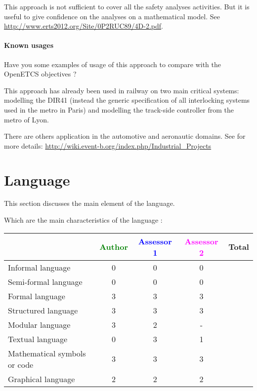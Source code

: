 \begin{author_comment}
This approach is not sufficient to cover all the safety analyses activities. But it is useful to give confidence on the analyses on a mathematical model. See \url{http://www.erts2012.org/Site/0P2RUC89/4D-2.pdf}.
\end{author_comment}


\paragraph{Known usages} Have you some examples of usage of this approach to  compare with the OpenETCS objectives ?


\begin{author_comment}
This approach has already been used in railway on two  main critical systems: modelling the DIR41 (instead the generic specification of all interlocking systems used in the metro in Paris)  and modelling the track-side controller from the metro of Lyon. 

There are others application in the automotive and aeronautic domains. See for more details: \url{http://wiki.event-b.org/index.php/Industrial_Projects}
\end{author_comment}


\section{Language}
This section discusses the main element of the language.

Which are the main characteristics of the language :

\begin{tabular}{|l | c | c | c | c|}
\hline
& \textcolor{green}{Author} & \textcolor{blue}{Assessor 1} & \textcolor{magenta}{Assessor 2} & Total \\
\hline 
Informal language & 0 & 0 & 0 &  \\
\hline 
Semi-formal language & 0 & 0 & 0 &  \\
\hline
Formal language & 3 & 3 & 3 &  \\
\hline
Structured language & 3 & 3 & 3 & \\
\hline
Modular language & 3 & 2 & - & \\
\hline
Textual language & 0 & 3 & 1 & \\
\hline
Mathematical symbols or code & 3 & 3 & 3 & \\
\hline
Graphical language & 2 & 2 & 2 & \\
\hline
\end{tabular}

